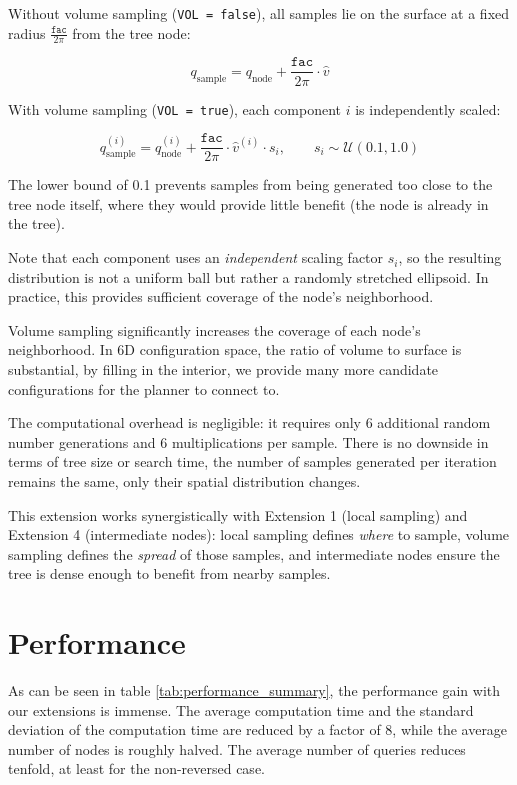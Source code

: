 \documentclass[a4paper,12pt]{article}
\begin{document}
Without volume sampling (\texttt{VOL = false}), all samples lie on the surface at a fixed radius $\frac{\texttt{fac}}{2\pi}$ from the tree node:

\[
    q_{\text{sample}} = q_{\text{node}} + \frac{\texttt{fac}}{2\pi} \cdot \hat{v}
\]

With volume sampling (\texttt{VOL = true}), each component $i$ is independently scaled:

\[
    q_{\text{sample}}^{(i)} = q_{\text{node}}^{(i)} + \frac{\texttt{fac}}{2\pi} \cdot \hat{v}^{(i)} \cdot s_i, \qquad s_i \sim \mathcal{U}(0.1, 1.0)
\]

The lower bound of 0.1 prevents samples from being generated too close to the tree node itself, where they would provide little benefit (the node is already in the tree).

Note that each component uses an \emph{independent} scaling factor $s_i$, so the resulting distribution is not a uniform ball but rather a randomly stretched ellipsoid. In practice, this provides sufficient coverage of the node's neighborhood.

Volume sampling significantly increases the coverage of each node's neighborhood. In 6D configuration space, the ratio of volume to surface is substantial, by filling in the interior, we provide many more candidate configurations for the planner to connect to.

The computational overhead is negligible: it requires only 6 additional random number generations and 6 multiplications per sample. There is no downside in terms of tree size or search time, the number of samples generated per iteration remains the same, only their spatial distribution changes.

This extension works synergistically with Extension 1 (local sampling) and Extension 4 (intermediate nodes): local sampling defines \emph{where} to sample, volume sampling defines the \emph{spread} of those samples, and intermediate nodes ensure the tree is dense enough to benefit from nearby samples.


\section{Performance}
As can be seen in table \ref{tab:performance_summary}, the performance gain with our extensions is immense. The average computation time and the standard deviation of the computation time are reduced by a factor of 8, while the average number of nodes is roughly halved. The average number of queries reduces tenfold, at least for the non-reversed case.
\end{document}
